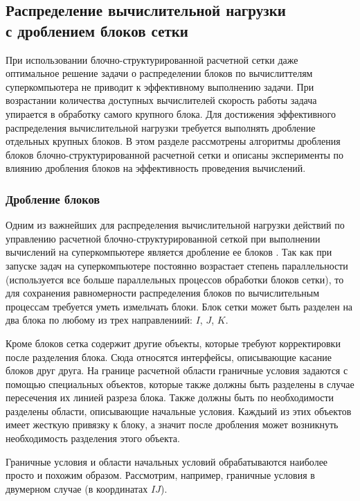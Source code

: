 \subsection{Распределение вычислительной нагрузки \\ с дроблением блоков сетки}

При использовании блочно-структурированной расчетной сетки\label{term:mesh_block_struct3} даже оптимальное решение задачи о распределении блоков по вычислиттелям суперкомпьютера не приводит к эффективному выполнению задачи.
При возрастании количества доступных вычислителей скорость работы задача упирается в обработку самого крупного блока.
Для достижения эффективного распределения вычислительной нагрузки требуется выполнять дробление отдельных крупных блоков.
В этом разделе рассмотрены алгоритмы дробления блоков блочно-структурированной расчетной сетки и описаны эксперименты по влиянию дробления блоков на эффективность проведения вычислений.

\subsubsection{Дробление блоков}

Одним из важнейших для распределения вычислительной нагрузки действий по управлению расчетной блочно-структурированной сеткой при выполнении вычислений на суперкомпьютере является дробление ее блоков \cite{Rybakov2016WithCut}.
Так как при запуске задач на суперкомпьютере постоянно возрастает степень параллельности (используется все больше параллельных процессов обработки блоков сетки), то для сохранения равномерности распределения блоков по вычислительным процессам требуется уметь измельчать блоки.
Блок сетки может быть разделен на два блока по любому из трех направлениий: $I$, $J$, $K$.

Кроме блоков сетка содержит другие объекты, которые требуют корректировки после разделения блока.
Сюда относятся интерфейсы, описывающие касание блоков друг друга.
На границе расчетной области граничные условия задаются с помощью специальных объектов, которые также должны быть разделены в случае пересечения их линией разреза блока.
Также должны быть по необходимости разделены области, описывающие начальные условия.
Каждыий из этих объектов имеет жесткую привязку к блоку, а значит после дробления может возникнуть
необходимость разделения этого объекта.

Граничные условия и области начальных условий обрабатываются наиболее просто и похожим образом.
Рассмотрим, например, граничные условия в двумерном случае (в координатах $IJ$).

